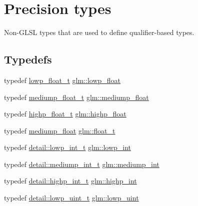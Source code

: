 \hypertarget{group__core__precision}{}\section{Precision types}
\label{group__core__precision}


Non-\/\+G\+L\+SL types that are used to define qualifier-\/based types.  


\subsection*{Typedefs}
\begin{DoxyCompactItemize}
\item 
typedef \hyperlink{namespaceglm_a0a43b64238afac063f27ee7620205bf2}{lowp\+\_\+float\+\_\+t} \hyperlink{group__core__precision_ga2887fbc729ac5c1c5caeb7cd57a7145c}{glm\+::lowp\+\_\+float}
\item 
typedef \hyperlink{namespaceglm_aec127979a2b6edbf05b485cb4e8c47cc}{mediump\+\_\+float\+\_\+t} \hyperlink{group__core__precision_gac785826c039fe6c97c03b37c81c1a68e}{glm\+::mediump\+\_\+float}
\item 
typedef \hyperlink{namespaceglm_af6f4e45ae06ae3f979dd30cafe7d07c6}{highp\+\_\+float\+\_\+t} \hyperlink{group__core__precision_ga3d443a093adc053638ed7f81c5bfe300}{glm\+::highp\+\_\+float}
\item 
typedef \hyperlink{group__core__precision_gac785826c039fe6c97c03b37c81c1a68e}{mediump\+\_\+float} \hyperlink{group__core__precision_gae01b87f81bd15327230bf1b47c482b24}{glm\+::float\+\_\+t}
\item 
typedef \hyperlink{namespaceglm_1_1detail_a030a8128e369fc1f9c7982dc68a78ba7}{detail\+::lowp\+\_\+int\+\_\+t} \hyperlink{group__core__precision_ga4681244bf4a184734f03aa9df4e3d288}{glm\+::lowp\+\_\+int}
\item 
typedef \hyperlink{namespaceglm_1_1detail_aede0757f19204d1d44f716b3dd66d13c}{detail\+::mediump\+\_\+int\+\_\+t} \hyperlink{group__core__precision_ga2a3dcbcd7f4e17663d393a12061ac6ac}{glm\+::mediump\+\_\+int}
\item 
typedef \hyperlink{namespaceglm_1_1detail_a74c48e9deafcc33db998a4ee62da8d6e}{detail\+::highp\+\_\+int\+\_\+t} \hyperlink{group__core__precision_gaafed5240eb0a43328cb75faf5fb0a8c2}{glm\+::highp\+\_\+int}
\item 
typedef \hyperlink{namespaceglm_1_1detail_ad59c4581ad8ce0c3ef6146edaa7e15dc}{detail\+::lowp\+\_\+uint\+\_\+t} \hyperlink{group__core__precision_ga8077c90f2c87e419ea6c273157dcc1fc}{glm\+::lowp\+\_\+uint}

\end{DoxyCompactItemize}
